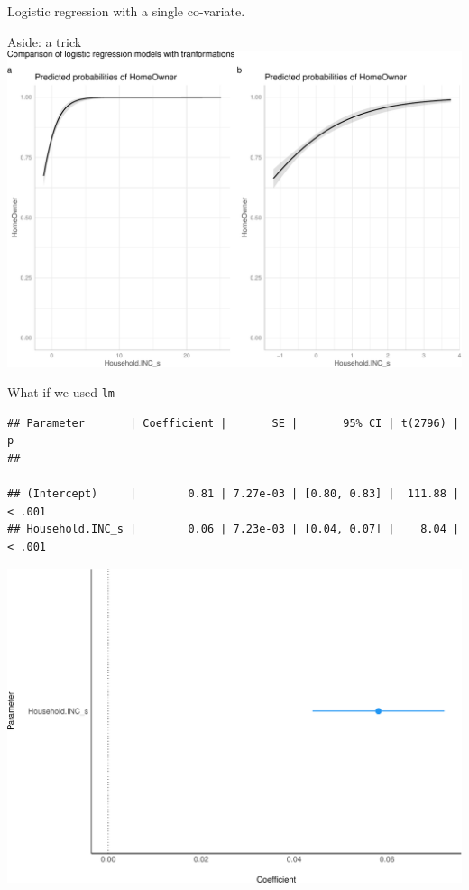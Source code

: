 \documentclass[
  ignorenonframetext,
]{beamer}
\begin{document}
\begin{frame}[fragile]{Logistic regression with a single co-variate.}
\begin{block}{Aside: a trick}
\includegraphics{slides_files/figure-beamer/unnamed-chunk-18-1.pdf}
\end{block}

\begin{block}{What if we used \texttt{lm}}
\protect\hypertarget{what-if-we-used-lm}{}
\begin{verbatim}
## Parameter       | Coefficient |       SE |       95% CI | t(2796) |      p
## --------------------------------------------------------------------------
## (Intercept)     |        0.81 | 7.27e-03 | [0.80, 0.83] |  111.88 | < .001
## Household.INC_s |        0.06 | 7.23e-03 | [0.04, 0.07] |    8.04 | < .001
\end{verbatim}

\includegraphics{slides_files/figure-beamer/unnamed-chunk-19-1.pdf}
\end{block}


\end{frame}
\end{document}
